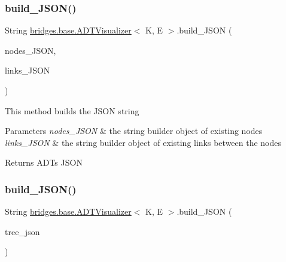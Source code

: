 \subsubsection{\texorpdfstring{build\+\_\+\+J\+S\+O\+N()}{build\_JSON()}\hspace{0.1cm}{\footnotesize\ttfamily [1/2]}}
{\footnotesize\ttfamily String \hyperlink{classbridges_1_1base_1_1_a_d_t_visualizer}{bridges.\+base.\+A\+D\+T\+Visualizer}$<$ K, E $>$.build\+\_\+\+J\+S\+ON (\begin{DoxyParamCaption}\item[{String\+Builder}]{nodes\+\_\+\+J\+S\+ON,  }\item[{String\+Builder}]{links\+\_\+\+J\+S\+ON }\end{DoxyParamCaption})}

This method builds the J\+S\+ON string 
\begin{DoxyParams}{Parameters}
{\em nodes\+\_\+\+J\+S\+ON} & the string builder object of existing nodes \\
\hline
{\em links\+\_\+\+J\+S\+ON} & the string builder object of existing links between the nodes \\
\hline
\end{DoxyParams}
\begin{DoxyReturn}{Returns}
A\+DT\textquotesingle{}s J\+S\+ON 
\end{DoxyReturn}
\hypertarget{classbridges_1_1base_1_1_a_d_t_visualizer_a520eef21260f327101b7e013f9814c45}{}\label{classbridges_1_1base_1_1_a_d_t_visualizer_a520eef21260f327101b7e013f9814c45} 
\subsubsection{\texorpdfstring{build\+\_\+\+J\+S\+O\+N()}{build\_JSON()}\hspace{0.1cm}{\footnotesize\ttfamily [2/2]}}
{\footnotesize\ttfamily String \hyperlink{classbridges_1_1base_1_1_a_d_t_visualizer}{bridges.\+base.\+A\+D\+T\+Visualizer}$<$ K, E $>$.build\+\_\+\+J\+S\+ON (\begin{DoxyParamCaption}\item[{String}]{tree\+\_\+json }\end{DoxyParamCaption})}

\hypertarget{classbridges_1_1base_1_1_a_d_t_visualizer_a1f37c20302432878a91c03544b81cc27}{}\label{classbridges_1_1base_1_1_a_d_t_visualizer_a1f37c20302432878a91c03544b81cc27} 
